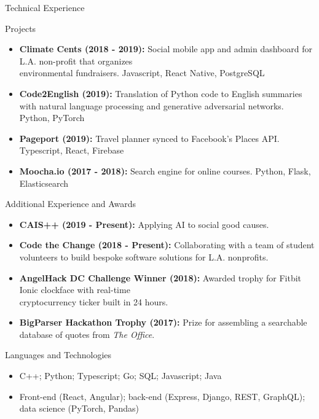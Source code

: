 \documentclass[calibri]{mcdowellcv}
\begin{document}
\begin{cvsection}{Technical Experience}
	\begin{cvsubsection}{Projects}{}{}
		\begin{itemize}
			\item \textbf{Climate Cents (2018 - 2019):} Social mobile app and admin dashboard for L.A. non-profit that organizes\\ environmental fundraisers. Javascript, React Native, PostgreSQL
			\item \textbf{Code2English (2019):} Translation of Python code to English summaries with natural language processing and generative adversarial networks. Python, PyTorch
			\item \textbf{Pageport (2019):} Travel planner synced to Facebook's Places API. Typescript, React, Firebase
			\item \textbf{Moocha.io (2017 - 2018):} Search engine for online courses. Python, Flask, Elasticsearch
		\end{itemize}
	\end{cvsubsection}
\end{cvsection}

\begin{cvsection}{Additional Experience and Awards}
	\begin{cvsubsection}{}{}{}
		\begin{itemize}
			\item \textbf{CAIS++ (2019 - Present):} Applying AI to social good causes.
			\item \textbf{Code the Change (2018 - Present):} Collaborating with a team of student volunteers to build bespoke software solutions for L.A. nonprofits.
			\item \textbf{AngelHack DC Challenge Winner (2018):} Awarded trophy for Fitbit Ionic clockface with real-time \\cryptocurrency ticker built in 24 hours.
			\item \textbf{BigParser Hackathon Trophy (2017):} Prize for assembling a searchable database of quotes from \textit{The Office}.
		\end{itemize}
	\end{cvsubsection}
\end{cvsection}

\begin{cvsection}{Languages and Technologies}
	\begin{cvsubsection}{}{}{}
		\begin{itemize}
			\item C++; Python; Typescript; Go; SQL; Javascript; Java
			\item Front-end (React, Angular); back-end (Express, Django, REST, GraphQL); data science (PyTorch, Pandas)
		\end{itemize}
	\end{cvsubsection}
\end{cvsection}
\end{document}
